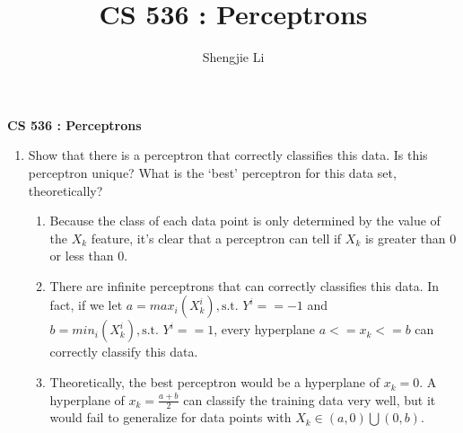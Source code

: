 \documentclass[letter, 12pt]{article}
\author{Shengjie Li}
\title{CS 536 : Perceptrons}
\begin{document}
    \centerline{\textbf{CS 536 : Perceptrons}}
    \begin{enumerate}
        \item {Show that there is a perceptron that correctly classifies this data. Is this perceptron unique? What is the ‘best’ perceptron for this data set, theoretically?}
        \begin{enumerate}
            \item{Because the class of each data point is only determined by the value of the $ X_k $ feature, it's clear that a perceptron can tell if $ X_k $ is greater than 0 or less than 0.}
            \item{There are infinite perceptrons that can correctly classifies this data. In fact, if we let $ a = max_i(X^i_k), \text{s.t. } Y^i == -1 $ and $ b = min_i(X^i_k), \text{s.t. } Y^i == 1 $, every hyperplane $ a <= x_k <= b $ can correctly classify this data.}
            \item{Theoretically, the best perceptron would be a hyperplane of $ x_k = 0 $. A hyperplane of $ x_k = \frac{a + b}{2} $ can classify the training data very well, but it would fail to generalize for data points with $ X_k \in (a, 0)  \bigcup (0, b). $}
        \end{enumerate}
        

\end{enumerate}
\end{document}
